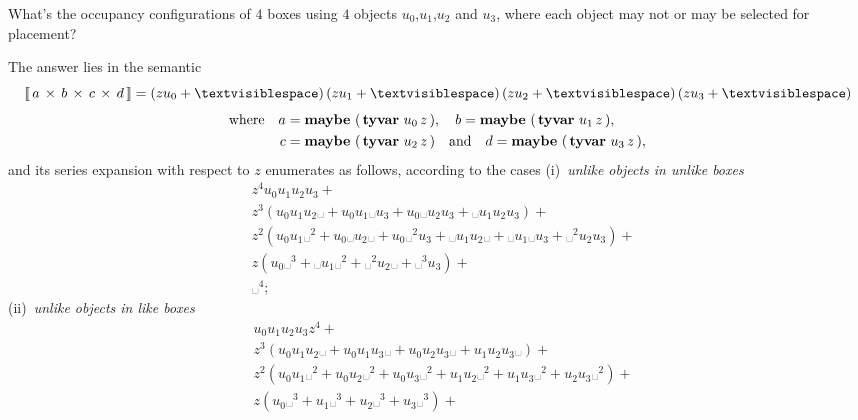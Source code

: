 \begin{example}
What's the occupancy configurations of $4$ boxes using $4$ objects
$u_{0}$,$u_{1}$,$u_{2}$ and $u_{3}$, where each object may not or may be
selected for placement?

The answer lies in the semantic
\begin{displaymath}
    \semantic{\tycp{a}{\tycp{b}{\tycp{c}{d}}}} = \left(z u_{0} + ␣\right) \left(z u_{1} + ␣\right) \left(z u_{2} + ␣\right) \left(z u_{3} + ␣\right)
\end{displaymath}
\begin{displaymath}
\begin{split}
\text{where}\quad
a&={\textbf{maybe}\,\left(\,\textbf{tyvar}\,\,u_{0}\,z\,\right)},\quad b={\textbf{maybe}\,\left(\,\textbf{tyvar}\,\,u_{1}\,z\,\right)},\\
c&={\textbf{maybe}\,\left(\,\textbf{tyvar}\,\,u_{2}\,z\,\right)}\quad\text{and}\quad d={\textbf{maybe}\,\left(\,\textbf{tyvar}\,\,u_{3}\,z\,\right)},
\end{split}
\end{displaymath}
and its series expansion with respect to $z$ enumerates as follows,
according to the cases (i)~\textit{unlike objects in unlike boxes}
\begin{displaymath}
\begin{split}
&z^{4} u_{0} u_{1} u_{2} u_{3} +\\
&z^{3} \left(u_{0} u_{1} u_{2} ␣ + u_{0} u_{1} ␣ u_{3} + u_{0} ␣ u_{2} u_{3} + ␣ u_{1} u_{2} u_{3}\right) + \\
&z^{2} \left(u_{0} u_{1} ␣^{2} + u_{0} ␣ u_{2} ␣ + u_{0} ␣^{2} u_{3} + ␣ u_{1} u_{2} ␣ + ␣ u_{1} ␣ u_{3} + ␣^{2} u_{2} u_{3}\right) + \\
&z \left(u_{0} ␣^{3} + ␣ u_{1} ␣^{2} + ␣^{2} u_{2} ␣ + ␣^{3} u_{3}\right) + \\
&␣^{4};
\end{split}
\end{displaymath}
(ii)~\textit{unlike objects in like boxes}
\begin{displaymath}
\begin{split}
&u_{0} u_{1} u_{2} u_{3} z^{4} + \\
&z^{3} \left(u_{0} u_{1} u_{2} ␣ + u_{0} u_{1} u_{3} ␣ + u_{0} u_{2} u_{3} ␣ + u_{1} u_{2} u_{3} ␣\right) + \\
&z^{2} \left(u_{0} u_{1} ␣^{2} + u_{0} u_{2} ␣^{2} + u_{0} u_{3} ␣^{2} + u_{1} u_{2} ␣^{2} + u_{1} u_{3} ␣^{2} + u_{2} u_{3} ␣^{2}\right) + \\
&z \left(u_{0} ␣^{3} + u_{1} ␣^{3} + u_{2} ␣^{3} + u_{3} ␣^{3}\right) +\\

\end{split}
\end{displaymath}
\end{example}
